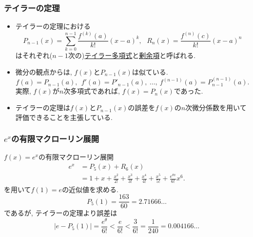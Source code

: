 




\begin{frame}
\frametitle{テイラーの定理}


\begin{itemize}
\item テイラーの定理における
$$
P_{n-1}(x)=\sum_{k=0}^{n-1}\frac{f^{(k)}(a)}{k!}(x-a)^k, \ \ \ 
R_n(x)=\frac{f^{(n)}(c)}{k!}(x-a)^n
$$
はそれぞれ($n-1$次の)\underline{テイラー多項式}と\underline{剰余項}と呼ばれる. 
\item 微分の観点からは, $f(x)$と$P_{n-1}(x)$は似ている. 
$$
f(a)=P_{n-1}(a), \ \ f '(a)=P'_{n-1}(a), \ \dots, \  f^{(n-1)}(a)=P^{(n-1)}_{n-1}(a). 
$$
実際, $f(x)$が$n$次多項式であれば, $f(x)=P_n(x)$であった. 
\item テイラーの定理は$f(x)$と$P_{n-1}(x)$の誤差を$f(x)$の$n$次微分係数を用いて評価できることを主張している. 
\end{itemize}

\end{frame}








\begin{frame}
\frametitle{$e^x$の有限マクローリン展開}

$f(x)=e^x$の有限マクローリン展開
\begin{align*}
e^x &= P_5(x)+R_6(x) \\
& = 1+x+\frac{x^2}{2!}+\frac{x^3}{3!}+\frac{x^4}{4!}+\frac{x^5}{5!}+\frac{e^{\theta x}}{6!}x^6. 
\end{align*}
を用いて$f(1)=e$の近似値を求める. 
$$
P_5(1)=\frac{163}{60}=2.71666\dots
$$
であるが, テイラーの定理より誤差は
$$
|e-P_5(1)|=\frac{e^\theta}{6!}<\frac{e}{6!}<\frac{3}{6!}=\frac{1}{240}=0.004166\dots
$$

\end{frame}




